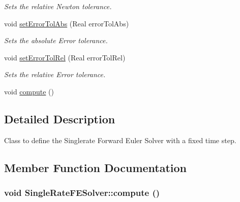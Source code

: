 \begin{DoxyCompactItemize}
\begin{DoxyCompactList}\small\item\em Sets the relative Newton tolerance. \item\end{DoxyCompactList}\item 
\hypertarget{classSingleRateFESolver_ac2b98eed3ec2af8b0708953b2b957031}{
void \hyperlink{classSingleRateFESolver_ac2b98eed3ec2af8b0708953b2b957031}{setErrorTolAbs} (Real errorTolAbs)}
\label{classSingleRateFESolver_ac2b98eed3ec2af8b0708953b2b957031}

\begin{DoxyCompactList}\small\item\em Sets the absolute Error tolerance. \item\end{DoxyCompactList}\item 
\hypertarget{classSingleRateFESolver_a3f93cd51aef89e0ccbdef8b8baf267de}{
void \hyperlink{classSingleRateFESolver_a3f93cd51aef89e0ccbdef8b8baf267de}{setErrorTolRel} (Real errorTolRel)}
\label{classSingleRateFESolver_a3f93cd51aef89e0ccbdef8b8baf267de}

\begin{DoxyCompactList}\small\item\em Sets the relative Error tolerance. \item\end{DoxyCompactList}\item 
void \hyperlink{classSingleRateFESolver_a4beb6ba564a2df02b0c96342646b3be9}{compute} ()
\end{DoxyCompactItemize}


\subsection{Detailed Description}
Class to define the Singlerate Forward Euler Solver with a fixed time step. 

\subsection{Member Function Documentation}
\hypertarget{classSingleRateFESolver_a4beb6ba564a2df02b0c96342646b3be9}{
\subsubsection[{compute}]{\setlength{\rightskip}{0pt plus 5cm}void SingleRateFESolver::compute ()}}
\label{classSingleRateFESolver_a4beb6ba564a2df02b0c96342646b3be9}


